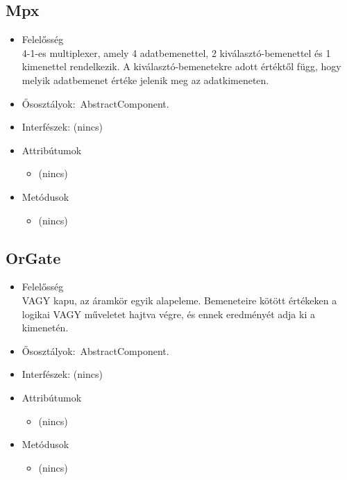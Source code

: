 \subsection{Mpx}
\begin{itemize}
\item Felelősség\\
4-1-es multiplexer, amely 4 adatbemenettel, 2 kiválasztó-bemenettel és 1 kimenettel rendelkezik. A kiválasztó-bemenetekre adott értéktől függ, hogy melyik adatbemenet értéke jelenik meg az adatkimeneten.
\item Ősosztályok:\ AbstractComponent.
\item Interfészek: (nincs)
\item Attribútumok $\ $
\begin{itemize}
\item (nincs)
\end{itemize}
\item Metódusok$\ $
\begin{itemize}
\item (nincs)
\end{itemize}
\end{itemize}

\subsection{OrGate}
\begin{itemize}
\item Felelősség\\
VAGY kapu, az áramkör egyik alapeleme. Bemeneteire kötött értékeken a logikai VAGY műveletet hajtva végre, és ennek eredményét adja ki a kimenetén.
\item Ősosztályok:\ AbstractComponent.
\item Interfészek: (nincs)
\item Attribútumok $\ $
\begin{itemize}
\item (nincs)
\end{itemize}
\item Metódusok$\ $
\begin{itemize}
\item (nincs)
\end{itemize}
\end{itemize}

